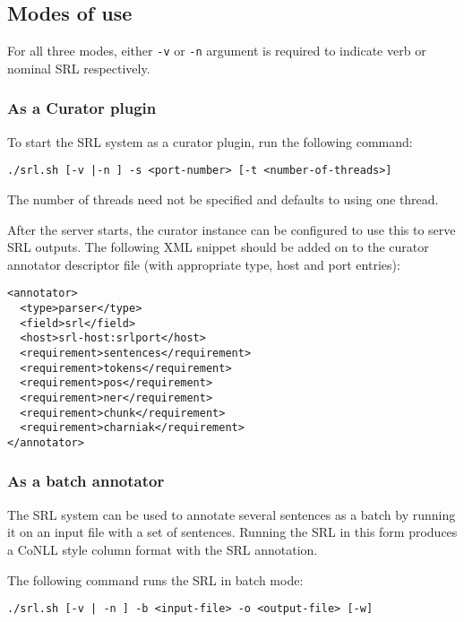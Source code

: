 \documentclass[11pt]{article}
\begin{document}
\subsection{Modes of use}
\label{sec-2_3}

   For all three modes, either \texttt{-v} or \texttt{-n} argument is required to
   indicate verb or nominal SRL respectively.
   
\subsubsection{As a Curator plugin}
\label{sec-2_3_1}

   To start the SRL system as a curator plugin, run the following command:
\begin{verbatim}
./srl.sh [-v |-n ] -s <port-number> [-t <number-of-threads>]
\end{verbatim}

   The number of threads need not be specified and defaults to using
   one thread. 

   After the server starts, the curator instance can be configured to
   use this to serve SRL outputs. The following XML snippet should be
   added on to the curator annotator descriptor file (with appropriate
   type, host and port entries):

\begin{verbatim}
<annotator>
  <type>parser</type>
  <field>srl</field>
  <host>srl-host:srlport</host>
  <requirement>sentences</requirement>
  <requirement>tokens</requirement>
  <requirement>pos</requirement>
  <requirement>ner</requirement>
  <requirement>chunk</requirement>
  <requirement>charniak</requirement>
</annotator>
\end{verbatim}

   
\subsubsection{As a batch annotator}
\label{sec-2_3_2}

   The SRL system can be used to annotate several sentences as a batch
   by running it on an input file with a set of sentences. Running the
   SRL in this form produces a CoNLL style column format with the SRL
   annotation. 

   The following command runs the SRL in batch mode:
   
\begin{verbatim}
./srl.sh [-v | -n ] -b <input-file> -o <output-file> [-w]
\end{verbatim}
   
\end{document}

